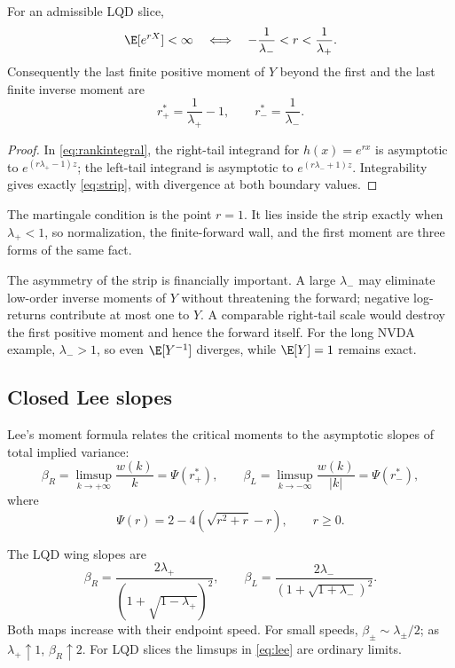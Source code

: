 \begin{proposition}
\label{prop:strip}
For an admissible LQD slice,
\begin{equation}
\E[e^{rX}]<\infty
\quad\Longleftrightarrow\quad
-\frac1{\lambda_-}<r<\frac1{\lambda_+}.
\label{eq:strip}
\end{equation}
Consequently the last finite positive moment of $Y$ beyond the first and the
last finite inverse moment are
\[
r_+^*=\frac1{\lambda_+}-1,
\qquad
r_-^*=\frac1{\lambda_-}.
\]
\end{proposition}

\begin{proof}
In \eqref{eq:rankintegral}, the right-tail integrand for $h(x)=e^{rx}$ is
asymptotic to $e^{(r\lambda_+-1)z}$; the left-tail integrand is asymptotic to
$e^{(r\lambda_-+1)z}$.  Integrability gives exactly
\eqref{eq:strip}, with divergence at both boundary values.
\end{proof}

The martingale condition is the point $r=1$.  It lies inside the strip exactly
when $\lambda_+<1$, so normalization, the finite-forward wall, and the first
moment are three forms of the same fact.

The asymmetry of the strip is financially important.  A large $\lambda_-$
may eliminate low-order inverse moments of $Y$ without threatening the
forward; negative log-returns contribute at most one to $Y$.  A comparable
right-tail scale would destroy the first positive moment and hence the
forward itself.  For the long NVDA example, $\lambda_->1$, so even
$\E[Y^{-1}]$ diverges, while $\E[Y]=1$ remains exact.

\subsection{Closed Lee slopes}

Lee's moment formula \citep{Lee2004} relates the critical moments to the
asymptotic slopes of total implied variance:
\begin{equation}
\beta_R=\limsup_{k\to+\infty}\frac{w(k)}k=\Psi(r_+^*),
\qquad
\beta_L=\limsup_{k\to-\infty}\frac{w(k)}{|k|}=\Psi(r_-^*),
\label{eq:lee}
\end{equation}
where
\[
\Psi(r)=2-4(\sqrt{r^2+r}-r),\qquad r\ge0.
\]

\begin{proposition}
\label{prop:leeclosed}
The LQD wing slopes are
\begin{equation}
\beta_R=\frac{2\lambda_+}{(1+\sqrt{1-\lambda_+})^2},
\qquad
\beta_L=\frac{2\lambda_-}{(1+\sqrt{1+\lambda_-})^2}.
\label{eq:leeclosed}
\end{equation}
Both maps increase with their endpoint speed.  For small speeds,
$\beta_\pm\sim\lambda_\pm/2$; as $\lambda_+\uparrow1$, $\beta_R\uparrow2$.
For LQD slices the limsups in \eqref{eq:lee} are ordinary limits.
\end{proposition}

